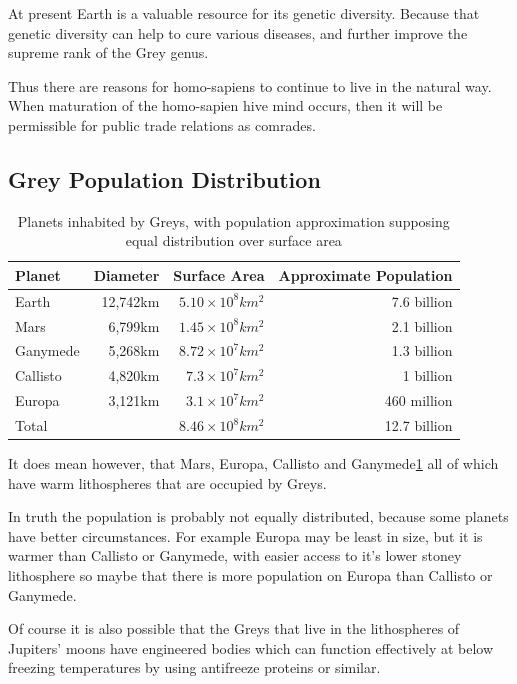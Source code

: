 \documentclass{report}
\begin{document}
At present Earth is a valuable resource for its genetic diversity. Because that
genetic diversity can help to cure various diseases, and further improve the
supreme rank of the Grey genus. 

Thus there are reasons for homo-sapiens to continue to live in the natural way.
When maturation of the homo-sapien hive mind occurs, then it will be
permissible for public trade relations as comrades.

\subsection{Grey Population Distribution}
\label{popdist}
\begin{table}
\begin{tabular}{lrrr}
  Planet & Diameter & Surface Area & Approximate Population\\
\midrule
  Earth & 12,742km & $5.10\times10^8km^2$& 7.6 billion\\
  Mars & 6,799km & $1.45\times10^8km^2$& 2.1 billion \\
  Ganymede & 5,268km & $8.72\times10^7km^2$ & 1.3 billion \\
  Callisto & 4,820km & $7.3\times10^7km^2$ & 1 billion\\
  Europa & 3,121km & $3.1\times10^7km^2$& 460 million\\
\midrule
  Total &   & $8.46\times10^8km^2$ & 12.7 billion\\
\end{tabular}
\caption{Planets inhabited by Greys, with population approximation supposing
equal distribution over surface area}
\label{table:planets}
\end{table}

It does mean however, that Mars, Europa, Callisto and 
Ganymede\ref{table:planets} all of which
have warm lithospheres that are occupied by Greys. 

In truth the population is probably not equally distributed, because some
planets have better circumstances. For example Europa may be least in size, but
it is warmer than Callisto or Ganymede, with easier access to it's lower stoney
lithosphere so maybe that there is more population on Europa than Callisto or
Ganymede. 

Of course it is also possible that the Greys that live in the lithospheres of
Jupiters' moons have engineered bodies which can function effectively at below
freezing temperatures by using antifreeze proteins or similar. 
\end{document}
